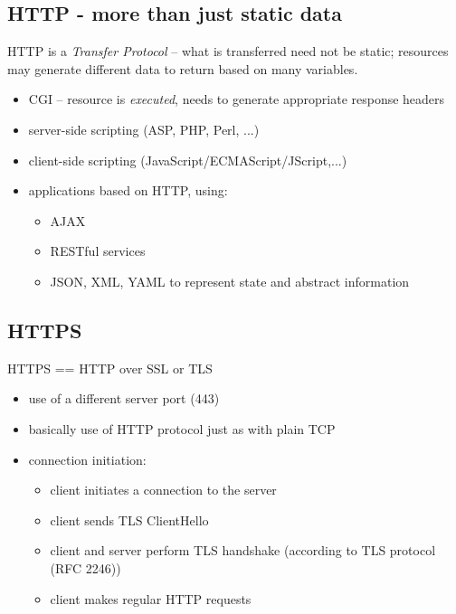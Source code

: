 \documentclass[xga]{xdvislides}
\begin{document}
\subsection{HTTP - more than just static data}
HTTP is a {\em Transfer Protocol} -- what is transferred need not be
static; resources may generate different data to return based on many
variables.

\begin{itemize}
	\item CGI -- resource is {\em executed}, needs to generate
		appropriate response headers
	\item server-side scripting (ASP, PHP, Perl, ...)
	\item client-side scripting (JavaScript/ECMAScript/JScript,...)
	\item applications based on HTTP, using:
		\begin{itemize}
			\item AJAX
			\item RESTful services
			\item JSON, XML, YAML to represent state and
				abstract information
		\end{itemize}
\end{itemize}


\subsection{HTTPS}
HTTPS == HTTP over SSL or TLS
\begin{itemize}
	\item use of a different server port (443)
	\item basically use of HTTP protocol just as with plain TCP
	\item connection initiation:
		\begin{itemize}
			\item client initiates a connection to the server
			\item client sends TLS ClientHello
			\item client and server perform TLS handshake (according to TLS
				protocol (RFC 2246))
			\item client makes regular HTTP requests
		\end{itemize}
\end{itemize}
\end{document}
